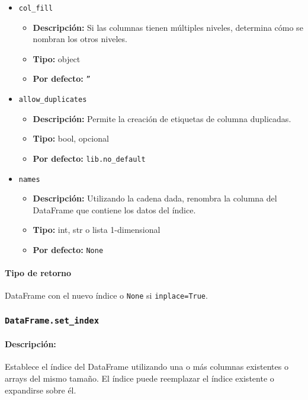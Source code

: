 \begin{itemize}
            \item \texttt{col\_fill}
                \begin{itemize}
                    \item \textbf{Descripción:} Si las columnas tienen múltiples niveles, determina cómo se nombran los otros niveles.
                    \item \textbf{Tipo:} object
                    \item \textbf{Por defecto:} \texttt{''}
                \end{itemize}

            \item \texttt{allow\_duplicates}
                \begin{itemize}
                    \item \textbf{Descripción:} Permite la creación de etiquetas de columna duplicadas.
                    \item \textbf{Tipo:} bool, opcional
                    \item \textbf{Por defecto:} \texttt{lib.no\_default}
                \end{itemize}

            \item \texttt{names}
                \begin{itemize}
                    \item \textbf{Descripción:} Utilizando la cadena dada, renombra la columna del DataFrame que contiene los datos del índice.
                    \item \textbf{Tipo:} int, str o lista 1-dimensional
                    \item \textbf{Por defecto:} \texttt{None}
                \end{itemize}
        \end{itemize}

        \paragraph{Tipo de retorno}
        DataFrame con el nuevo índice o \texttt{None} si \texttt{inplace=True}.


        \subsubsection{\texttt{DataFrame.set\_index}}

        \paragraph{Descripción:}
        Establece el índice del DataFrame utilizando una o más columnas existentes o arrays del mismo tamaño. El índice puede reemplazar el índice existente o expandirse sobre él.

